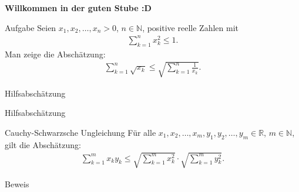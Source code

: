\documentclass[10pt]{beamer}
\title{}
\author{Artur's Mathematikstübchen}
\date{}
\def\bN{\mathbb{N}}
\def\bR{\mathbb{R}}
\begin{document}

\begin{frame}
    \begin{center}
        \textbf{\huge Willkommen in der guten Stube \newline \newline :D}
    \end{center}
\end{frame}




\begin{frame}
    \begin{alertblock}{Aufgabe}
        Seien \( x_{1}, x_{2}, \ldots, x_{n} > 0 \), \( n \in \bN \), positive reelle Zahlen mit 
        \begin{align*}
            \sum_{k = 1}^{n} x_{k}^{2} 
            \leq 1.
        \end{align*}
        Man zeige die Abschätzung:
        \begin{align*}
            \sum_{k = 1}^{n} \sqrt{x_{k}}
            \leq \sqrt{\sum_{k = 1}^{n} \frac{1}{x_{k}}}.
        \end{align*}
    \end{alertblock}
\end{frame}



\begin{frame}{Hilfsabschätzung}
    
\end{frame}



\begin{frame}{Hilfsabschätzung}
    \begin{block}{Cauchy-Schwarzsche Ungleichung}
        Für alle \( x_{1}, x_{2}, \ldots, x_{m}, y_{1}, y_{2}, \ldots, y_{m} \in \bR \), \( m \in \bN \), gilt die Abschätzung:
        \begin{align*}
            \sum_{k = 1}^{m} x_{k} y_{k}
            \leq \sqrt{\sum_{k = 1}^{m} x_{k}^{2}} \cdot \sqrt{\sum_{k = 1}^{m} y_{k}^{2}}.
        \end{align*}
    \end{block}
\end{frame}



\begin{frame}{Beweis}
    
\end{frame}
\end{document}
